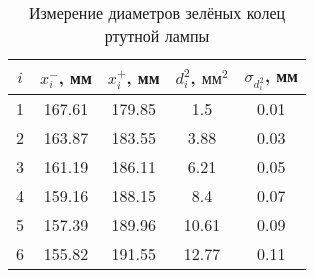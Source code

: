 \begin{table}[h]
			\begin{center}
				\begin{tabular}{|c|c|c|c|c|}
					\hline
          $ i $ & $ x_i^- $, мм & $ x_i^+ $, мм & $ d_i^2 $, $ \text{мм}^2 $ & $ \sigma_{d_i^2} $, мм\\ 
					\hline
					1 & 167.61 & 179.85 & 1.5 & 0.01 \\\hline
					2 & 163.87 & 183.55 & 3.88 & 0.03 \\\hline
					3 & 161.19 & 186.11 & 6.21 & 0.05 \\\hline
					4 & 159.16 & 188.15 & 8.4 & 0.07 \\\hline
					5 & 157.39 & 189.96 & 10.61 & 0.09 \\\hline
					6 & 155.82 & 191.55 & 12.77 & 0.11 \\
					\hline
				\end{tabular}
			\end{center}
			\caption{Измерение диаметров зелёных колец ртутной лампы}
			\label{Gr_table}
\end{table}
